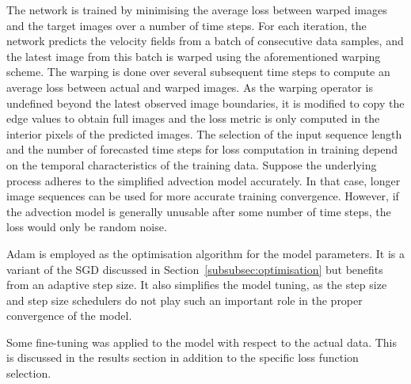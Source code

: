 The network is trained by minimising the average loss between warped images and the target images over a number of time steps.
For each iteration, the network predicts the velocity fields from a batch of consecutive data samples, and the latest image from this batch is warped using the aforementioned warping scheme.
The warping is done over several subsequent time steps to compute an average loss between actual and warped images.
As the warping operator is undefined beyond the latest observed image boundaries, it is modified to copy the edge values to obtain full images and the loss metric is only computed in the interior pixels of the predicted images.
The selection of the input sequence length and the number of forecasted time steps for loss computation in training depend on the temporal characteristics of the training data.
Suppose the underlying process adheres to the simplified advection model accurately.
In that case, longer image sequences can be used for more accurate training convergence.
However, if the advection model is generally unusable after some number of time steps, the loss would only be random noise.

Adam is employed as the optimisation algorithm for the model parameters.
It is a variant of the SGD discussed in Section~\ref{subsubsec:optimisation} but benefits from an adaptive step size.
It also simplifies the model tuning, as the step size and step size schedulers do not play such an important role in the proper convergence of the model.

Some fine-tuning was applied to the model with respect to the actual data. 
This is discussed in the results section in addition to the specific loss function selection.
